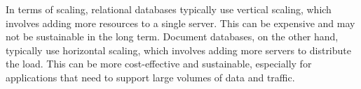 \documentclass[12pt]{exam}
\begin{document}
\begin{questions}
{{            In terms of scaling, relational databases typically use vertical scaling, which involves adding more resources to a single server. This can be expensive and may not be sustainable in the long term. Document databases, on the other hand, typically use horizontal scaling, which involves adding more servers to distribute the load. This can be more cost-effective and sustainable, especially for applications that need to support large volumes of data and traffic.
        }%
    }
    
\end{questions}



\end{document}
